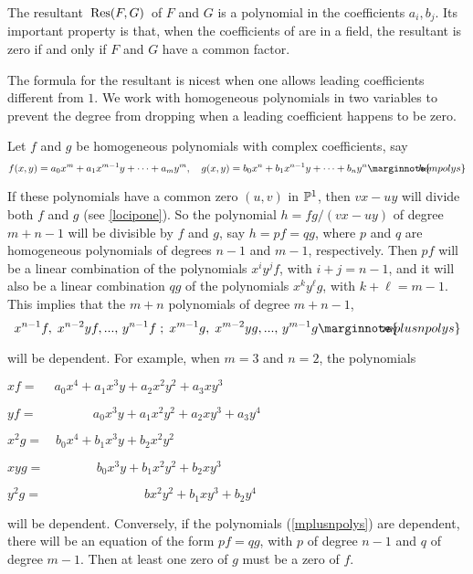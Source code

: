 \documentclass[leqno]{book}
\newcommand\Marginnote[1]{\marginnote{\hspace{-12pt}\normalfont{#1}}}
\theoremstyle{definition}%
\numberwithin{equation}{section}
\theoremstyle{theorem} %
\begin{document}
\no

The resultant $\,\operatorname{Res}(F,G)\,$  of $F$ and $G$ is a polynomial in the
coefficients $a_i,b_j$.  Its important property is that, when the
coefficients of are in a field, the resultant is zero if and
only if $F$ and $G$  have a common factor.


The formula for the resultant is nicest when one allows leading
coefficients different from $1$.  We work with homogeneous polynomials
in two variables to prevent the degree from dropping when a leading
coefficient happens to be zero.

\ms   Let $f$ and $g$ be homogeneous
polynomials with complex coefficients, say
\begin{equation}
f(x,y) = a_0x^m+a_1x^{m-1}y+ \cdots + a_my^m,\quad g(x,y) = b_0x^n
+ b_1x^{n-1}y + \cdots + b_ny^n\Marginnote{hompolys}\label{hompolys}
\end{equation} 

\no If these polynomials have a common zero $(u,v)$ in $\mathbb{P}^1$, then
$vx-uy$ will divide both $f$ and $g$ (see \ref{locipone}).  So the
polynomial $h= fg/(vx\!-\!uy)$ of degree $m\!+\!n\!-\!1$ will be
divisible by $f$ and $g$, say $h = pf = qg$, where $p$ and $q$ are
homogeneous polynomials of degrees $n\!-\!1$ and $m\!-\!1$,
respectively.  Then $pf$ will be a linear combination of the
polynomials $x^iy^jf$, with $i\!+\!j=n\!-\!1$, and it will also be a
linear combination $qg$ of the polynomials $x^ky^\ell g$, with
$k\!+\!\ell =m\!-\!1$.  This implies that the $m\!+\!n$ polynomials of
degree $m\!+\!n\!-\!1$,
\begin{equation}
 x^{n-1}f,\;x^{n-2}yf,...,\,y^{n-1}f\;;\;x^{m-1}g,\;x^{m-2}yg,
...,\,y^{m-1}g \Marginnote{mplusnpolys}\label{mplusnpolys}
\end{equation} 

\no
will be dependent.  For example, when $m=3$ and $n=2$, the polynomials

\bs

$ xf =\quad \; a_0x^4+a_1x^3y+a_2x^2y^2+a_3 xy^3 \quad $

$ yf =\quad \;\quad\quad \;\;\;\;a_0x^3y+a_1x^2y^2+a_2 xy^3 + a_3y^4$

$ x^2g =\quad b_0x^4+b_1x^3y+b_2x^2y^2 \quad \quad $

$ xyg =\quad \quad\quad \;\;\;\; b_0x^3y+b_1x^2y^2+b_2 xy^3 \quad $

$ y^2g =\quad \quad \quad\quad\quad\quad \quad \quad bx^2y^2+b_1 xy^3+b_2y^4$

\bsno
will be dependent.   
Conversely, if the
polynomials (\ref{mplusnpolys}) are dependent, there will be an
equation of the form $pf = qg$, with $p$ of degree $n\!-\!1$ and $q$
of degree $m\!-\!1$.  Then at least one zero of $g$ must be a zero of
$f$.
\end{document}
